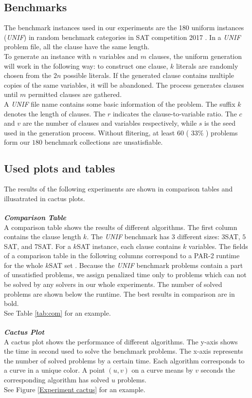 \documentclass[12pt,a4paper,twoside]{scrartcl}
\numberwithin{equation}{section}
\begin{document}
\subsection{Benchmarks}
\label{benchmark}
The benchmark instances used in our experiments are the 180 uniform instances (\emph{UNIF}) in random benchmark categories in SAT competition 2017 \cite{balyo2017proceedings}. In a \emph{UNIF} problem file, all the clause have the same length.\\
To generate an instance with $n$ variables and $m$ clauses, the uniform generation will work in the following way: to construct one clause, $k$ literals are randomly chosen from the $2n$ possible literals. If the generated clause contains multiple copies of the same variables, it will be abandoned. The process generates clauses until $m$ permitted clauses are gathered.\\
A \emph{UNIF} file name contains some basic information of the problem. The suffix $k$  denotes the length of clauses. The $r$ indicates the clause-to-variable ratio. The $c$ and $v$ are the number of clauses and variables respectively, while $s$ is the seed used in the generation process.
Without flitering, at least $60$ ( $33\%$ ) problems form our $180$ benchmark collections are unsatisfiable.
\clearpage
\subsection{Used plots and tables}
The results of the following experiments are shown in comparison tables and  illusatrated in cactus plots.  \\
\\
\emph{\textbf{Comparison Table}}\\
A comparison table shows the results of different algorithms. The first column contains the
clause length $k$. The  \emph{UNIF} benchmark has $3$ different sizes: $3$SAT, $5$SAT, and $7$SAT. For a $k$SAT instance, each clause contains $k$ variables. The fields of a comparison table in the following columns correspond to a PAR-2 runtime for the whole $k$SAT set \cite{balyo2017proceedings}. Because the  \emph{UNIF} benchmark problems contain a part of unsatisfied problems, we assign penalized time only to problems which can not be solved by any solvers in our whole experiments. The number of solved problems are shown below the runtime. The best results in comparison are in bold.
\\
See Table \ref{tab:com} for an example.\\
\\
\emph{\textbf{Cactus Plot}}\\
A cactus plot shows the performance of different algorithms. The y-axis shows the time in second used to solve the benchmark problems.  The x-axis represents the number of solved problems by a certain time. Each algorithm corresponds to a curve in a unique color. A point $(u, v)$ on a curve means by $v$ seconds the corresponding algorithm has solved  $u$ problems.  \\
See Figure \ref{Experiment cactus} for an example.\\
\end{document}
